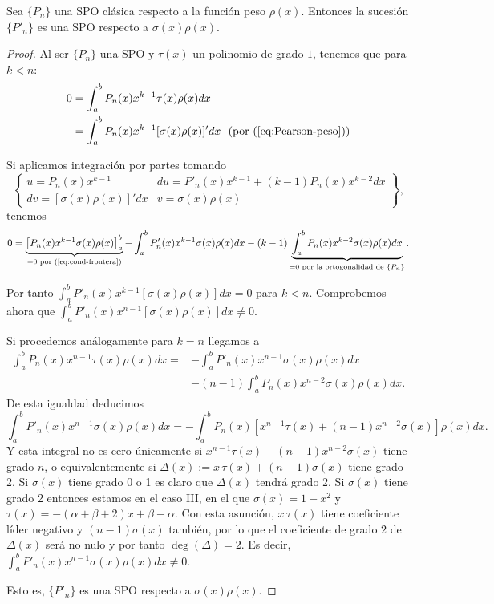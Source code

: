 \begin{teorema}
    \label{th:ortogonalidad-derivadas}
    Sea $\{P_n\}$ una SPO clásica respecto a la función peso $\rho(x)$. Entonces la sucesión $\{P'_n\}$ es una SPO respecto a $\sigma(x)\rho(x)$.
\end{teorema}
\begin{proof}
    Al ser $\{P_n\}$ una SPO y $\tau(x)$ un polinomio de grado $1$, tenemos que para $k<n$:
    \begin{equation*}
        \begin{split}
            0 &= \int_a^b P_n(x)x^{k-1}\tau(x)\rho(x)dx \\
            &= \int_a^b P_n(x)x^{k-1}[\sigma(x)\rho(x)]'dx \ \ \text{(por (\ref{eq:Pearson-peso}))}
        \end{split}
    \end{equation*}

    Si aplicamos integración por partes tomando $$\left\{\begin{array}{ll}
       u=P_n(x)x^{k-1} & du = P'_n(x)x^{k-1} + (k-1)P_n(x)x^{k-2}dx\\
       dv =  [\sigma(x)\rho(x)]'dx  & v=\sigma(x)\rho(x)
    \end{array}\right\},$$ tenemos
    \begin{equation*}
        0 = \underbrace{\left[P_n(x)x^{k-1}\sigma(x)\rho(x)\right]_a^b}_{=0 \text{ por (\ref{eq:cond-frontera})}} - \int_a^b P'_n(x)x^{k-1}\sigma(x)\rho(x)dx - (k-1)\underbrace{\int_a^b P_n(x)x^{k-2}\sigma(x)\rho(x)dx}_{=0 \text{ por la ortogonalidad de } \{P_n\}}.
    \end{equation*}

    Por tanto $\int_a^b P'_n(x)x^{k-1}[\sigma(x)\rho(x)]dx=0$ para $k<n$. Comprobemos ahora que $\int_a^b P'_n(x)x^{n-1}[\sigma(x)\rho(x)]dx\neq0$.

    Si procedemos análogamente para $k=n$ llegamos a
    \begin{equation*}
        \begin{split}
            \int_a^b P_n(x)x^{n-1}\tau(x)\rho(x)dx = &- \int_a^b P'_n(x)x^{n-1}\sigma(x)\rho(x)dx\\ & - (n-1)\int_a^b P_n(x)x^{n-2}\sigma(x)\rho(x)dx.
        \end{split}
    \end{equation*}
    De esta igualdad deducimos
    $$
    \int_a^b P'_n(x)x^{n-1}\sigma(x)\rho(x)dx = - \int_a^b P_n(x)[x^{n-1}\tau(x) + (n-1)x^{n-2}\sigma(x)]\rho(x)dx.
    $$
    Y esta integral no es cero únicamente si $x^{n-1}\tau(x) + (n-1)x^{n-2}\sigma(x)$ tiene grado $n$, o equivalentemente si $\Delta(x):=x\,\tau(x) + (n-1)\sigma(x)$ tiene grado 2. Si $\sigma(x)$ tiene grado 0 o 1 es claro que $\Delta(x)$ tendrá grado 2. Si $\sigma(x)$ tiene grado 2 entonces estamos en el caso III, en el que $\sigma(x)=1-x^2$ y $\tau(x)=-(\alpha+\beta+2)x+\beta -\alpha$. Con esta asunción, $x\,\tau(x)$ tiene coeficiente líder negativo y $(n-1)\sigma(x)$ también, por lo que el coeficiente de grado $2$ de $\Delta(x)$ será no nulo y por tanto $\deg(\Delta)=2$. Es decir, $\int_a^b P'_n(x)x^{n-1}\sigma(x)\rho(x)dx \neq 0$.
    
    Esto es, $\{P'_n\}$ es una SPO respecto a $\sigma(x)\rho(x)$.
\end{proof}

